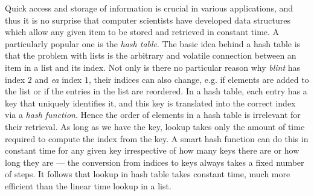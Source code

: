 Quick access and storage of information is crucial in various applications, and thus it is no surprise that computer scientists have developed data structures which allow any given item to be stored and retrieved in constant time.
A particularly popular one is the \emph{hash table}.
The basic idea behind a hash table is that the problem with lists is the arbitrary and volatile connection between an item in a list and its index.
Not only is there no particular reason why \emph{blint} has index $2$ and \emph{ea} index $1$, their indices can also change, e.g. if elements are added to the list or if the entries in the list are reordered.
In a hash table, each entry has a key that uniquely identifies it, and this key is translated into the correct index via a \emph{hash function}.
Hence the order of elements in a hash table is irrelevant for their retrieval.
As long as we have the key, lookup takes only the amount of time required to compute the index from the key.
A smart hash function can do this in constant time for any given key irrespective of how many keys there are or how long they are --- the conversion from indices to keys always takes a fixed number of steps.
It follows that lookup in hash table takes constant time, much more efficient than the linear time lookup in a list.

